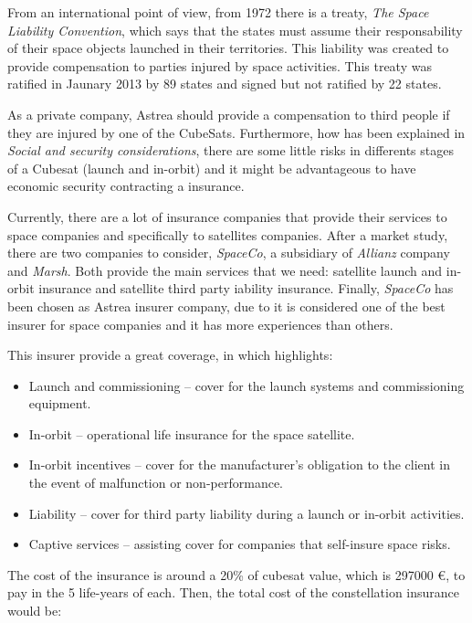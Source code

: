 From an international point of view, from 1972 there is a treaty, \textit{The Space Liability Convention}, which says that the states must assume their responsability of their space objects launched in their territories. This liability was created to provide compensation to parties injured by space activities. This treaty was ratified in Jaunary 2013 by 89 states and signed but not ratified by 22 states. \cite{UN}

As a private company, Astrea should provide a compensation to third people if they are injured by one of the CubeSats. Furthermore,  how has been explained in \textit{Social and security considerations}, there are some little risks in differents stages of a Cubesat (launch and in-orbit) and it might be advantageous to have economic security contracting a insurance. 

Currently, there are a lot of insurance companies that provide their services to space companies and specifically to  satellites companies. After a market study, there are two companies to consider, \textit{SpaceCo}, a subsidiary of \textit{Allianz} company and \textit{Marsh}. Both provide the main services that we need: satellite launch and in-orbit insurance and satellite third party iability insurance. Finally, \textit{SpaceCo} has been chosen as Astrea insurer company, due to it is considered one of the best insurer for space companies and it has more experiences than others.

This insurer provide a great coverage, in which highlights:

\begin{itemize}
	\item Launch and commissioning – cover for the launch systems and commissioning equipment.
	\item In-orbit – operational life insurance for the space satellite.
	\item In-orbit incentives – cover for the manufacturer’s obligation to the client in the event of malfunction 		          or non-performance.
	\item Liability – cover for third party liability during a launch or in-orbit activities.
	\item Captive services – assisting cover for companies that self-insure space risks. \cite{allianz}
\end{itemize}

The cost of the insurance is around a 20\% of cubesat value, which is 297000 \euro, to pay in the 5 life-years of each. Then, the total cost of the constellation insurance would be:

